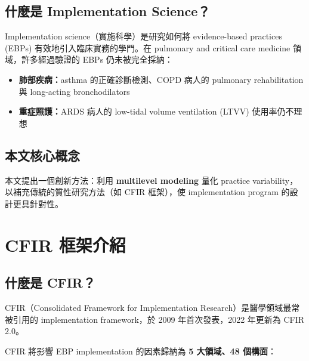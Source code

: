 \documentclass[12pt,a4paper]{article}
\begin{document}
\subsection{什麼是 Implementation Science？}

Implementation science（實施科學）是研究如何將 evidence-based practices (EBPs) 有效地引入臨床實務的學門。在 pulmonary and critical care medicine 領域，許多經過驗證的 EBPs 仍未被完全採納：

\begin{itemize}
    \item \textbf{肺部疾病：}asthma 的正確診斷檢測、COPD 病人的 pulmonary rehabilitation 與 long-acting bronchodilators
    \item \textbf{重症照護：}ARDS 病人的 low-tidal volume ventilation (LTVV) 使用率仍不理想
\end{itemize}

\subsection{本文核心概念}

本文提出一個創新方法：利用 \textbf{multilevel modeling} 量化 practice variability，以補充傳統的質性研究方法（如 CFIR 框架），使 implementation program 的設計更具針對性。

\section{CFIR 框架介紹}

\subsection{什麼是 CFIR？}

CFIR（Consolidated Framework for Implementation Research）是醫學領域最常被引用的 implementation framework，於 2009 年首次發表，2022 年更新為 CFIR 2.0。

CFIR 將影響 EBP implementation 的因素歸納為 \textbf{5 大領域、48 個構面}：
\end{document}

